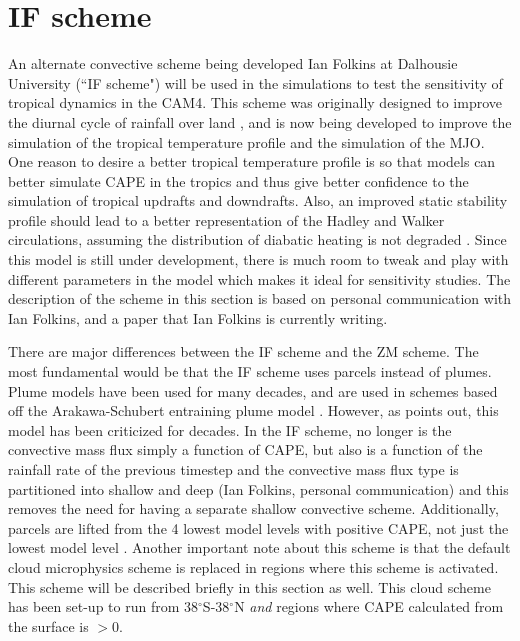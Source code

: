 \documentclass[letterpaper,12pt,titlepage,oneside,final]{book}
\begin{document}
\section{IF scheme}
An alternate convective scheme being developed Ian Folkins at Dalhousie University (``IF scheme") will be used in the simulations to test the sensitivity of tropical dynamics in the CAM4. This scheme was originally designed to improve the diurnal cycle of rainfall over land \citep{folkins_simple_2014}, and is now being developed to improve the simulation of the tropical temperature profile and the simulation of the MJO. One reason to desire a better tropical temperature profile is so that models can better simulate CAPE in the tropics and thus give better confidence to the simulation of tropical updrafts and downdrafts. Also, an improved static stability profile should lead to a better representation of the Hadley and Walker circulations, assuming the distribution of diabatic heating is not degraded \citep{sohn_role_2016,mitas_recent_2006}. Since this model is still under development, there is much room to tweak and play with different parameters in the model which makes it ideal for sensitivity studies. The description of the scheme in this section is based on personal communication with Ian Folkins, \cite{folkins_simple_2014} and a paper that Ian Folkins is currently writing.

There are major differences between the IF scheme and the ZM scheme. The most fundamental would be that the IF scheme uses parcels instead of plumes. Plume models have been used for many decades, and are used in schemes based off the Arakawa-Schubert entraining plume model \citep{yano_basic_2014}. However, as \cite{yano_basic_2014} points out, this model has been criticized for decades. In the IF scheme, no longer is the convective mass flux simply a function of CAPE, but also is a function of the rainfall rate of the previous timestep and the convective mass flux type is partitioned into shallow and deep (Ian Folkins, personal communication) and this removes the need for having a separate shallow convective scheme. Additionally, parcels are lifted from the 4 lowest model levels with positive CAPE, not just the lowest model level \citep{folkins_simple_2014}. Another important note about this scheme is that the default cloud microphysics scheme is replaced in regions where this scheme is activated. This scheme will be described briefly in this section as well. This cloud scheme has been set-up to run from 38$^{\circ}$S-38$^{\circ}$N \textit{and} regions where CAPE calculated from the surface is $>0$.
\end{document}
